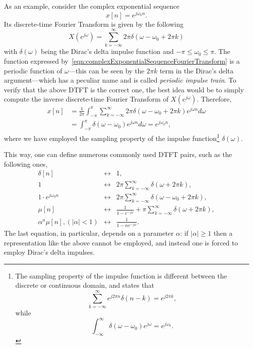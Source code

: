\documentclass[\documentfontsize, twocolumn]{\classname}
\begin{document}
As an example, consider the complex exponential sequence
\begin{equation}\label{eqn:complexExponentialSequence}
    x[n] = e^{j \omega_0 n}.
\end{equation}
Its discrete-time Fourier Transform is given by the following
\begin{equation}\label{eqn:complexExponentialSequenceFourierTransform}
    X(e^{j\omega}) = \sum_{k=-\infty}^\infty 2\pi \delta(\omega - \omega_0 + 2\pi k)
\end{equation}
with $\delta(\omega)$ being the Dirac's delta impulse function and $-\pi \leq \omega_0 \leq \pi$. The function expressed by~\ref{eqn:complexExponentialSequenceFourierTransform} is a periodic function of $\omega$---this can be seen by the $2\pi k$ term in the Dirac's delta argument---which has a peculiar name and is called \emph{periodic impulse train}. To verify that the above DTFT is the correct one, the best idea would be to simply compute the inverse discrete-time Fourier Transform of $X(e^{j\omega})$. Therefore,
\begin{align*}
    x[n] &= \frac 1 {2\pi} \int_{-\pi}^\pi \sum_{k=-\infty}^\infty 2\pi\delta(\omega - \omega_0 + 2\pi k)e^{j\omega n}d\omega\\
         &= \int_{-\pi}^\pi \delta(\omega - \omega_0) e^{j\omega n} d\omega = e^{j\omega_0 n},
\end{align*}
where we have employed the sampling property of the impulse function\footnote{
    The sampling property of the impulse function is different between the discrete or continuous domain, and states that
    \begin{equation}\label{eqn:samplingPropertyDeltaSum}
        \sum_{k=-\infty}^\infty e^{j2\pi n}\delta(n-k) = e^{j 2 \pi k},
    \end{equation}
    while
    \begin{equation}\label{eqn:samplingPropertyDeltaIntegral}
        \int_{-\infty}^\infty \delta(\omega-\omega_0)e^{j\omega} = e^{j\omega_0}.
    \end{equation}
} $\delta(\omega)$.

This way, one can define numerous commonly used DTFT pairs, such as the following ones,
\[
    \begin{array}{rcl}
        \delta[n] & \longleftrightarrow & 1, \\
        1 & \longleftrightarrow & 2\pi \sum_{k=-\infty}^\infty \delta(\omega + 2\pi k), \\
        1\cdot e^{j\omega_0 n} & \longleftrightarrow & 2\pi \sum_{k=-\infty}^\infty \delta(\omega - \omega_0 + 2\pi k), \\
        \mu[n] & \longleftrightarrow & \frac {1}{1 - e^{-j\omega}} + \pi \sum_{k=-\infty}^\infty \delta(\omega + 2\pi k), \\
        \alpha^n \mu[n], (|\alpha| < 1) & \longleftrightarrow & \frac{1}{1 - \alpha e^{-j\omega}}.
    \end{array}
\]
The last equation, in particular, depends on a parameter $\alpha$: if $|\alpha| \geq 1$ then a representation like the above cannot be employed, and instead one is forced to employ Dirac's delta impulses.
\clearpage
\end{document}
